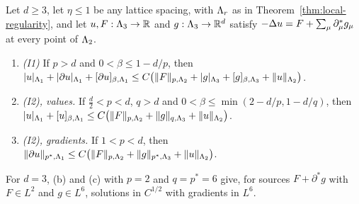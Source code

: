 \begin{theorem}\label{thm:lp-local}
Let $d\ge3$, let $\eta\le1$ be any lattice spacing, with $\Lambda_r$ as in Theorem~\ref{thm:local-regularity}, and let $u,F:\Lambda_3\to\mathbb R$ and $g:\Lambda_3\to\mathbb R^d$ satisfy $-\Delta u=F+\sum_\mu\partial^*_\mu g_\mu$ at every point of $\Lambda_2$.
\begin{enumerate}[label=(\alph*)]
\item \emph{(I1)} If $p>d$ and $0<\beta\le1-d/p$, then $|u|_{\Lambda_1}+|\partial u|_{\Lambda_1}+[\partial u]_{\beta,\Lambda_1}\le C\big(\|F\|_{p,\Lambda_2}+|g|_{\Lambda_3}+[g]_{\beta,\Lambda_3}+\|u\|_{\Lambda_2}\big)$.
\item \emph{(I2), values.} If $\frac d2<p<d$, $q>d$ and $0<\beta\le\min(2-d/p,1-d/q)$, then $|u|_{\Lambda_1}+[u]_{\beta,\Lambda_1}\le C\big(\|F\|_{p,\Lambda_2}+\|g\|_{q,\Lambda_3}+\|u\|_{\Lambda_2}\big)$.
\item \emph{(I2), gradients.} If $1<p<d$, then $\|\partial u\|_{p^*,\Lambda_1}\le C\big(\|F\|_{p,\Lambda_2}+\|g\|_{p^*,\Lambda_3}+\|u\|_{\Lambda_2}\big)$.
\end{enumerate}
For $d=3$, (b) and (c) with $p=2$ and $q=p^*=6$ give, for sources $F+\partial^*g$ with $F\in L^2$ and $g\in L^6$, solutions in $C^{1/2}$ with gradients in $L^6$.
\end{theorem}

